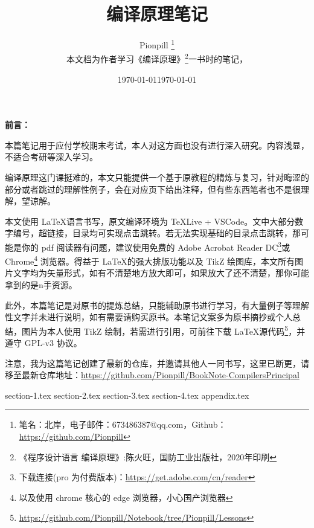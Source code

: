 \documentclass{PionpillNote-art}
\title{编译原理笔记}
\author{
    Pionpill \footnote{笔名：北岸，电子邮件：673486387@qq.com，Github：\url{https://github.com/Pionpill}} \\
    本文档为作者学习《编译原理》\footnote{《程序设计语言 编译原理》:陈火旺，国防工业出版社，2020年印刷}一书时的笔记，\\
}
\date{\today}
\begin{document}
\maketitle

\noindent\textbf{前言：}

本篇笔记用于应付学校期末考试，本人对这方面也没有进行深入研究。内容浅显，不适合考研等深入学习。

编译原理这门课挺难的，本文只能提供一个基于原教程的精炼与复习，针对晦涩的部分或者跳过的理解性例子，会在对应页下给出注释，但有些东西笔者也不是很理解，望谅解。

本文使用 \LaTeX 语言书写，原文编译环境为 TeXLive + VSCode。文中大部分数字编号，超链接，目录均可实现点击跳转。若无法实现基础的目录点击跳转，那可能是你的 pdf 阅读器有问题，建议使用免费的 Adobe Acrobat Reader DC\footnote{下载连接(pro 为付费版本)：\url{https://get.adobe.com/cn/reader}}或 Chrome\footnote{以及使用 chrome 核心的 edge 浏览器，小心国产浏览器} 浏览器。得益于 \LaTeX 的强大排版功能以及 TikZ 绘图库，本文所有图片文字均为矢量形式，如有不清楚地方放大即可，如果放大了还不清楚，那你可能拿到的是n手资源。

此外，本篇笔记是对原书的提炼总结，只能辅助原书进行学习，有大量例子等理解性文字并未进行说明，如有需要请购买原书。本笔记文案多为原书摘抄或个人总结，图片为本人使用 TikZ 绘制，若需进行引用，可前往下载 \LaTeX 源代码\footnote{\url{https://github.com/Pionpill/Notebook/tree/Pionpill/Lessons}}，并遵守 GPL-v3 协议。

注意，我为这篇笔记创建了最新的仓库，并邀请其他人一同书写，这里已断更，请移至最新仓库地址：\url{https://github.com/Pionpill/BookNote-CompilersPrincipal}

\date{\today}

\newpage

\tableofcontents
\thispagestyle{empty}
\newpage
\setcounter{page}{1} 

{section-1.tex}
{section-2.tex}
{section-3.tex}
{section-4.tex}
{appendix.tex}
\end{document}
